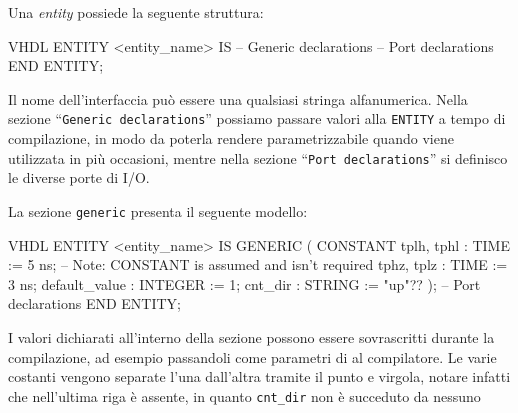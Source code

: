 \documentclass[10pt,a4paper,oneside]{scrbook}
\begin{document}
\noindent Una \textit{entity} possiede la seguente struttura:
\begin{sourcecode}{VHDL}
ENTITY <entity_name> IS
    -- Generic declarations
    -- Port declarations
END ENTITY;
\end{sourcecode}
Il nome dell'interfaccia può essere una qualsiasi stringa alfanumerica. 
Nella sezione ``\texttt{Generic declarations}'' possiamo passare valori 
alla \texttt{ENTITY} a tempo di compilazione, in modo da poterla rendere 
parametrizzabile quando viene utilizzata in più occasioni, mentre nella sezione 
``\texttt{Port declarations}'' si definisco le diverse porte di I/O.

La sezione \texttt{generic} presenta il seguente modello:
\begin{sourcecode}{VHDL}
ENTITY <entity_name> IS
    GENERIC (
        CONSTANT tplh, tphl : TIME        := 5 ns;
        -- Note: CONSTANT is assumed and isn't required
        tphz, tplz          : TIME        := 3 ns;
        default_value       : INTEGER     := 1;
        cnt_dir             : STRING      := "up"??
    );
    -- Port declarations
END ENTITY;
\end{sourcecode}
I valori dichiarati all'interno della sezione possono essere sovrascritti 
durante la compilazione, ad esempio passandoli come parametri di al compilatore.
Le varie costanti vengono separate l'una dall'altra tramite il punto e virgola, 
notare infatti che nell'ultima riga è assente, in quanto \texttt{cnt_dir} non è 
succeduto da nessuno
\end{document}
